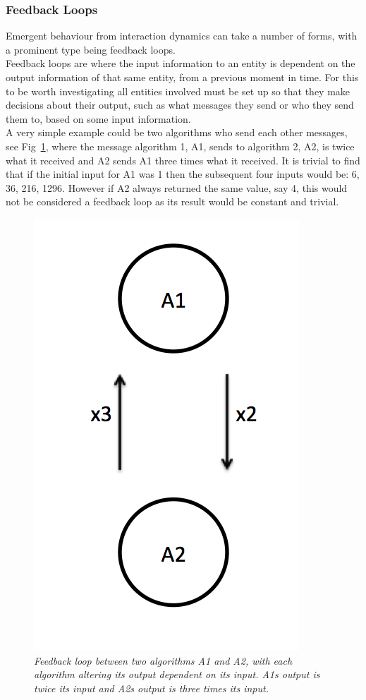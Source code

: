 \documentclass{article}
\begin{document}
\subsubsection{Feedback Loops}
Emergent behaviour from interaction dynamics can take a number of forms, with a prominent type being feedback loops.\\
Feedback loops are where the input information to an entity is dependent on the output information of that same entity, from a previous moment in time. For this to be worth investigating all entities involved must be set up so that they make decisions about their output, such as what messages they send or who they send them to, based on some input information.\\
A very simple example could be two algorithms who send each other messages, see Fig~\ref{fig:examplesimpletwofeedback}, where the message algorithm 1, A1, sends to algorithm 2, A2, is twice what it received and A2 sends A1 three times what it received. It is trivial to find that if the initial input for A1 was 1 then the subsequent four inputs would be: 6, 36, 216, 1296. However if A2 always returned the same value, say 4, this would not be considered a feedback loop as its result would be constant and trivial.         
\begin{figure}[H]
	\centering
	\includegraphics[scale=0.5]{simpletwofbex}
	\caption{\it Feedback loop between two algorithms A1 and A2, with each algorithm altering its output dependent on its input. A1s output is twice its input and A2s output is three times its input.}
	\label{fig:examplesimpletwofeedback}
\end{figure} 
\end{document}
